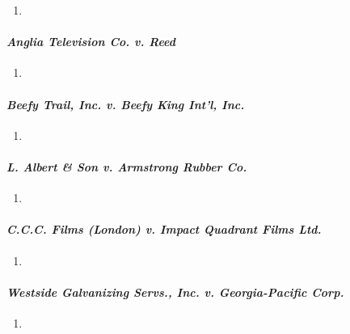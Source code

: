 \begin{enumerate}
    \item %
\end{enumerate}

\paragraph{\emph{Anglia Television Co. v. Reed}}

\begin{enumerate}
    \item %
\end{enumerate}

\paragraph{\emph{Beefy Trail, Inc. v. Beefy King Int'l, Inc.}}

\begin{enumerate}
    \item %
\end{enumerate}

\paragraph{\emph{L. Albert \& Son v. Armstrong Rubber Co.}}

\begin{enumerate}
    \item %
\end{enumerate}

\paragraph{\emph{C.C.C. Films (London) v. Impact Quadrant Films Ltd.}}

\begin{enumerate}
    \item %
\end{enumerate}

\paragraph{\emph{Westside Galvanizing Servs., Inc. v. Georgia-Pacific Corp.}}

\begin{enumerate}
    \item %
\end{enumerate}

